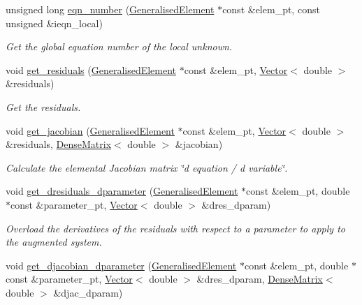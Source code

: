 \begin{DoxyCompactItemize}
unsigned long \hyperlink{classoomph_1_1FoldHandler_a30f2973860c13a183d5647a63b0c2ead}{eqn\+\_\+number} (\hyperlink{classoomph_1_1GeneralisedElement}{Generalised\+Element} $\ast$const \&elem\+\_\+pt, const unsigned \&ieqn\+\_\+local)
\begin{DoxyCompactList}\small\item\em Get the global equation number of the local unknown. \end{DoxyCompactList}\item 
void \hyperlink{classoomph_1_1FoldHandler_abfbec6da3dffeaf3b4df0ee4955101fd}{get\+\_\+residuals} (\hyperlink{classoomph_1_1GeneralisedElement}{Generalised\+Element} $\ast$const \&elem\+\_\+pt, \hyperlink{classoomph_1_1Vector}{Vector}$<$ double $>$ \&residuals)
\begin{DoxyCompactList}\small\item\em Get the residuals. \end{DoxyCompactList}\item 
void \hyperlink{classoomph_1_1FoldHandler_ad1bec54a2e0c5bd483ff0bf633bd6542}{get\+\_\+jacobian} (\hyperlink{classoomph_1_1GeneralisedElement}{Generalised\+Element} $\ast$const \&elem\+\_\+pt, \hyperlink{classoomph_1_1Vector}{Vector}$<$ double $>$ \&residuals, \hyperlink{classoomph_1_1DenseMatrix}{Dense\+Matrix}$<$ double $>$ \&jacobian)
\begin{DoxyCompactList}\small\item\em Calculate the elemental Jacobian matrix \char`\"{}d equation 
/ d variable\char`\"{}. \end{DoxyCompactList}\item 
void \hyperlink{classoomph_1_1FoldHandler_ad98b98488b683fa3ad9497b662e6e5b6}{get\+\_\+dresiduals\+\_\+dparameter} (\hyperlink{classoomph_1_1GeneralisedElement}{Generalised\+Element} $\ast$const \&elem\+\_\+pt, double $\ast$const \&parameter\+\_\+pt, \hyperlink{classoomph_1_1Vector}{Vector}$<$ double $>$ \&dres\+\_\+dparam)
\begin{DoxyCompactList}\small\item\em Overload the derivatives of the residuals with respect to a parameter to apply to the augmented system. \end{DoxyCompactList}\item 
void \hyperlink{classoomph_1_1FoldHandler_a674cf9fe7c065e54c95813c2baeea84c}{get\+\_\+djacobian\+\_\+dparameter} (\hyperlink{classoomph_1_1GeneralisedElement}{Generalised\+Element} $\ast$const \&elem\+\_\+pt, double $\ast$const \&parameter\+\_\+pt, \hyperlink{classoomph_1_1Vector}{Vector}$<$ double $>$ \&dres\+\_\+dparam, \hyperlink{classoomph_1_1DenseMatrix}{Dense\+Matrix}$<$ double $>$ \&djac\+\_\+dparam)

\end{DoxyCompactItemize}
